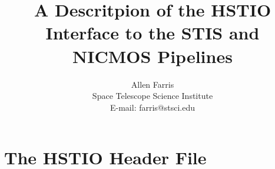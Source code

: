 \raggedbottom
\textwidth=6.5in
\textheight=9.0in
\headheight=0pt
\topmargin=-0.25in
\oddsidemargin=0pt
\evensidemargin=0pt
\pagestyle{plain}
\parindent=0pt
\parskip=12pt


\title{A Descritpion of the HSTIO Interface to the STIS and NICMOS Pipelines}
\author{Allen Farris\\Space Telescope Science Institute\\
E-mail: farris@stsci.edu}
\maketitle

\section {
The HSTIO Header File
}

